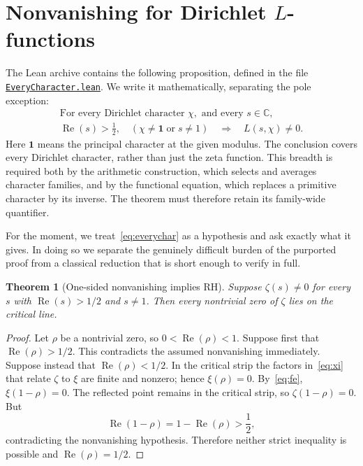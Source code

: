 \documentclass[11pt,openany,oneside]{scrbook}
\newtheorem{theorem}{Theorem}[chapter]
\theoremstyle{definition}
\theoremstyle{remark}
\newcommand{\CC}{\mathbb C}
\newcommand{\Rea}{\operatorname{Re}}
\newcommand{\baseurl}{https://github.com/CocoSgt/riemann-hypothesis-lean/blob/7cbf7a0c32fca1badf05931879a37c3f8a2b03b4/}
\newcommand{\sourcefile}[2]{\href{\baseurl#1}{\texttt{#2}}}
\begin{document}
\section{Nonvanishing for Dirichlet \texorpdfstring{$L$}{L}-functions}
The Lean archive contains the following proposition, defined in the file \sourcefile{src/Development/AutomorphicArithmetic/CharacterBoxes/EveryCharacter.lean}{EveryCharacter.lean}. We write it mathematically, separating the pole exception:
\begin{equation}\label{eq:everychar}
\begin{gathered}
\text{For every Dirichlet character }\chi,\text{ and every }s\in\CC,\\
\Rea(s)>\frac12,\quad (\chi\ne\mathbf{1}\;\text{or}\;s\ne1)
\quad\Longrightarrow\quad L(s,\chi)\ne0.
\end{gathered}
\end{equation}
Here $\mathbf{1}$ means the principal character at the given modulus. The conclusion covers every Dirichlet character, rather than just the zeta function. This breadth is required both by the arithmetic construction, which selects and averages character families, and by the functional equation, which replaces a primitive character by its inverse. The theorem must therefore retain its family-wide quantifier.

For the moment, we treat~\eqref{eq:everychar} as a hypothesis and ask exactly what it gives. In doing so we separate the genuinely difficult burden of the purported proof from a classical reduction that is short enough to verify in full.

\begin{theorem}[One-sided nonvanishing implies RH]\label{thm:rh}
Suppose $\zeta(s)\ne0$ for every $s$ with $\Rea(s)>1/2$ and $s\ne1$. Then every nontrivial zero of $\zeta$ lies on the critical line.
\end{theorem}
\begin{proof}
Let $\rho$ be a nontrivial zero, so $0<\Rea(\rho)<1$. Suppose first that $\Rea(\rho)>1/2$. This contradicts the assumed nonvanishing immediately. Suppose instead that $\Rea(\rho)<1/2$. In the critical strip the factors in~\eqref{eq:xi} that relate $\zeta$ to $\xi$ are finite and nonzero; hence $\xi(\rho)=0$. By~\eqref{eq:fe}, $\xi(1-\rho)=0$. The reflected point remains in the critical strip, so $\zeta(1-\rho)=0$. But
\[
\Rea(1-\rho)=1-\Rea(\rho)>\frac12,
\]
contradicting the nonvanishing hypothesis. Therefore neither strict inequality is possible and $\Rea(\rho)=1/2$.
\end{proof}
\end{document}

